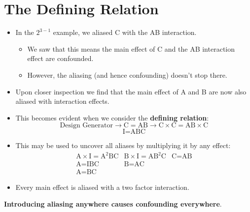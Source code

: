 \section{The Defining Relation}
\begin{itemize}
    \item In the $ 2^{3-1} $ example, we aliased C with the AB interaction.
          \begin{itemize}
              \item We saw that this means the main effect of C and the AB interaction effect are confounded.
              \item However, the aliasing (and hence confounding) doesn't stop there.
          \end{itemize}
\end{itemize}
\begin{itemize}[*]
    \item Upon closer inspection we find that the main effect of A and B are now also aliased with interaction
          effects.
\end{itemize}
\begin{itemize}
    \item This becomes evident when we consider the \textbf{defining relation}:
          \[ \text{Design Generator}\rightarrow\text{C}=\text{AB}\rightarrow \text{C}\times\text{C}=\text{AB}\times\text{C} \]
          \[ \text{I}=\text{ABC} \]
    \item This may be used to uncover all aliases by multiplying it by any effect:
          \[ \begin{array}{ccc}
                  \text{A}\times\text{I}=\text{A}^2\text{BC} & \text{B}\times\text{I}=\text{A}\text{B}^2\text{C} & \text{C}=\text{AB} \\
                  \text{A}=\text{IBC}                        & \text{B}=\text{AC}                                                     \\
                  \text{A}=\text{BC}
              \end{array} \]
    \item Every main effect is aliased with a two factor interaction.
\end{itemize}
\begin{framed}
    \begin{tightcenter}
        \textbf{Introducing aliasing anywhere causes confounding everywhere}.
    \end{tightcenter}
\end{framed}
